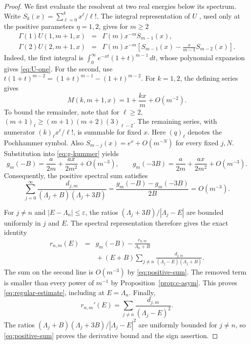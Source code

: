 \documentclass[12pt,a4paper]{article}
\numberwithin{equation}{section}
\theoremstyle{remark}
\theoremstyle{definition}
\begin{document}
\begin{proof}
We first evaluate the resolvent at two real energies below its spectrum.
Write $S_k(x)=\sum_{\ell=0}^k x^\ell/\ell!$. The integral representation
of $U$ \cite[Eq.~13.4.4]{DLMF}, used only at the positive parameters
$\eta=1,2$, gives for $m\ge2$
\begin{eqnarray}
\Gamma(1)U(1,m+1,x)
&=&\Gamma(m)x^{-m}S_{m-1}(x),\label{eq:U-one}\\
\Gamma(2)U(2,m+1,x)
&=&\Gamma(m)x^{-m}
\left[S_{m-1}(x)-\frac{x}{m-1}S_{m-2}(x)\right].
\label{eq:U-two}
\end{eqnarray}
Indeed, the first integral is
$\int_0^\infty e^{-xt}(1+t)^{m-1}\,dt$, whose polynomial expansion gives
\eqref{eq:U-one}. For the second, use
$t(1+t)^{m-2}=(1+t)^{m-1}-(1+t)^{m-2}$.
For $k=1,2$, the defining series gives
\begin{equation}\label{eq:M-reference}
M(k,m+1,x)=1+\frac{kx}{m}+O(m^{-2}).
\end{equation}
To bound the remainder, note that for $\ell\ge2$,
$(m+1)_\ell\ge(m+1)(m+2)(3)_{\ell-2}$. The remaining series, with
numerator $(k)_\ell x^\ell/\ell!$, is summable for fixed $x$.
Here $(q)_\ell$ denotes the Pochhammer symbol.
Also $S_{m-j}(x)=e^x+O(m^{-N})$ for every fixed $j,N$.
Substitution into \eqref{eq:g-kummer} yields
\begin{equation}\label{eq:reference-g}
g_m(-B)=\frac{a}{2m}+\frac{ax}{2m^2}+O(m^{-3}),
\qquad
g_m(-3B)=\frac{a}{2m}+\frac{ax}{2m^2}+O(m^{-3}).
\end{equation}
Consequently, the positive spectral sum satisfies
\begin{equation}\label{eq:positive-sum}
\sum_{j=0}^\infty
\frac{d_{j,m}}{(\Lambda_j+B)(\Lambda_j+3B)}
=\frac{g_m(-B)-g_m(-3B)}{2B}=O(m^{-3}).
\end{equation}

For $j\ne n$ and $|E-\Lambda_n|\le\varepsilon$, the ratios
$(\Lambda_j+3B)/|\Lambda_j-E|$ are bounded uniformly in $j$ and $E$.
The spectral representation therefore gives the exact identity
\begin{eqnarray}
r_{n,m}(E)
&=&g_m(-B)-\frac{c_{n,m}}{\Lambda_n+B}\nonumber\\
&&{}+(E+B)\sum_{j\ne n}
\frac{d_{j,m}}{(\Lambda_j-E)(\Lambda_j+B)}.
\label{eq:regular-reference}
\end{eqnarray}
The sum on the second line is $O(m^{-3})$ by
\eqref{eq:positive-sum}. The removed term is smaller than every power of
$m^{-1}$ by Proposition~\ref{prop:c-asym}. This proves
\eqref{eq:regular-estimate}, including at $E=\Lambda_n$.
Finally,
$$
r_{n,m}'(E)=\sum_{j\ne n}\frac{d_{j,m}}{(\Lambda_j-E)^2}.
$$
The ratios $(\Lambda_j+B)(\Lambda_j+3B)/|\Lambda_j-E|^2$ are uniformly
bounded for $j\ne n$, so \eqref{eq:positive-sum} proves the derivative
bound and the sign assertion.
\end{proof}
\end{document}
